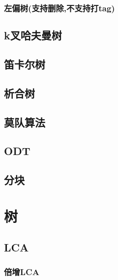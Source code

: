 \documentclass[a4paper,twocolumn]{article}
\begin{document}
\subsubsection{左偏树(支持删除,不支持打tag)}

\subsection{k叉哈夫曼树}
\begin{spacing}{1.5}

\end{spacing}

\subsection{笛卡尔树}
\begin{spacing}{1.5}

\end{spacing}

\subsection{析合树}
\begin{spacing}{1.5}

\end{spacing}

\subsection{莫队算法}

\subsection{ODT}

\subsection{分块}

\section{树}
\subsection{LCA}
\subsubsection{倍增LCA}

\end{document}
